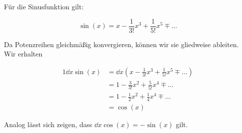 \item Für die Sinusfunktion gilt:

$$
	\sin(x) = x - \frac{1}{3!}x^3 + \frac{1}{5!} x^5 \mp \dots
$$

Da Potenzreihen gleichmäßig konvergieren, können wir sie gliedweise ableiten. Wir erhalten

\begin{alignat*}{1}
	\dd{}{x} \sin(x) &= \dd{}{x} \left(x - \frac{1}{3!}x^3 + \frac{1}{5!} x^5 \mp \dots \right) \\
					 &= 1-\frac{3}{3!}x^2 + \frac{5}{5!} x^4 \mp \dots \\
					 &= 1-\frac{1}{2}x^2 + \frac{1}{4} x^4 \mp \dots \\
					 &= \cos(x)
\end{alignat*}

Analog lässt sich zeigen, dass $\dd{}{x} \cos(x) = -\sin(x)$ gilt.